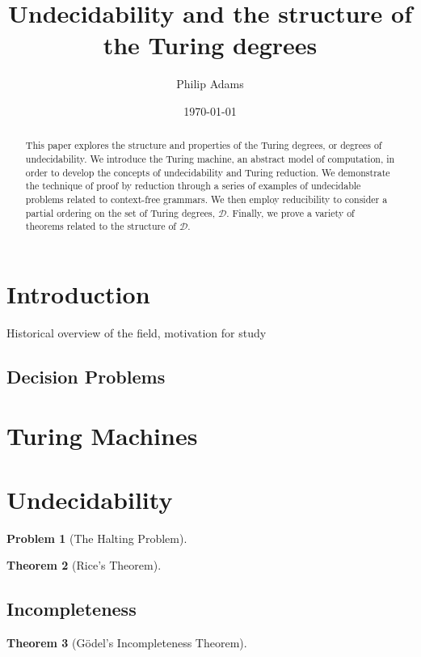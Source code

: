 \documentclass[psamsfonts]{amsart}
\title{Undecidability and the structure of the Turing degrees}
\author{Philip Adams}
\date{\today}
\newtheorem{thm}{Theorem}[section]
\newtheorem{prob}[thm]{Problem}
\theoremstyle{definition}
\theoremstyle{remark}
\numberwithin{equation}{section}
\begin{document}
\begin{abstract}

  This paper explores the structure and properties of the Turing degrees, or
  degrees of undecidability. We introduce the Turing machine, an abstract model
  of computation, in order to develop the concepts of undecidability and Turing
  reduction. We demonstrate the technique of proof by reduction through a series
  of examples of undecidable problems related to context-free grammars. We then
  employ reducibility to consider a partial ordering on the set of Turing degrees, $\mathcal{D}$. Finally, we prove a variety of theorems
  related to the structure of $\mathcal{D}$. 

\end{abstract}

\maketitle


\tableofcontents

\section{Introduction}
Historical overview of the field, motivation for study
\cite{ambos-spies06:_degrees_unsol}
\cite{soare16_turin_comput}
\cite{soare1999history}
\cite{lerman16:_degrees_unsol}
\subsection{Decision Problems}


\section{Turing Machines}
\cite{turing37_comput_number_with_applic_to_entsc}
\section{Undecidability}


\begin{prob}[The Halting Problem]
  \label{prob:halting}
  \cite{turing37_comput_number_with_applic_to_entsc}
  \cite{sipser13:_introd_theor_comput}
\end{prob}
\begin{thm}[Rice's Theorem] \cite{kozen99_autom}
\end{thm}
\subsection{Incompleteness}
\begin{thm}[G\"odel's Incompleteness Theorem] 
  \cite{kleene43_recur_predic_quant}
\end{thm}
\end{document}
